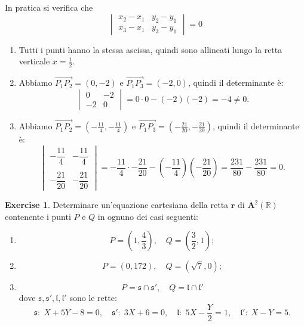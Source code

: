 \documentclass{article}
\theoremstyle{plain}
\theoremstyle{definition}
\newtheorem{xca}[exmp]{Exercise}
\theoremstyle{remark}
\begin{document}
In pratica si verifica che 
\[
\begin{vmatrix*}
x_2 - x_1 & y_2 - y_1 \\
x_3 - x_1 & y_3 - y_1
\end{vmatrix*}
=
0
\]
\begin{enumerate}
    \item Tutti i punti hanno la stessa ascissa, quindi sono allineati lungo la retta verticale $x=\frac{1}{2}$.
    \item Abbiamo $\overrightarrow{P_1P_2}=(0,-2)$ e $\overrightarrow{P_1P_3}=(-2,0)$, quindi il determinante è:
    \[ \begin{vmatrix}
        0 & -2 \\
        -2 & 0
    \end{vmatrix}= 0\cdot0 - (-2)(-2) = -4 \neq 0.\]
    \item Abbiamo $\overrightarrow{P_1P_2}=\left(-\frac{11}{4},-\frac{11}{4}\right)$ e $\overrightarrow{P_1P_3}=\left(-\frac{21}{20},-\frac{21}{20}\right)$, quindi il determinante è:
    \[ \begin{vmatrix}
        -\dfrac{11}{4} & -\dfrac{11}{4} \\\\
        -\dfrac{21}{20} & -\dfrac{21}{20}
    \end{vmatrix} = -\dfrac{11}{4}\cdot -\dfrac{21}{20} - \left(-\dfrac{11}{4}\right)\left(-\dfrac{21}{20}\right) = \dfrac{231}{80} - \dfrac{231}{80} = 0.\]
\end{enumerate}


\vspace{10pt}

\begin{bxthm}
\begin{xca}
    Determinare un'equazione cartesiana della retta $\mathbf{r}$ di $\mathbf{A}^2(\mathbb{R})$ contenente i punti $P$ e $Q$ in ognuno dei casi seguenti:
    \begin{enumerate}
        \item \[P=\left(1,\dfrac{4}{3}\right),\quad Q=\left(\dfrac{3}{2},1\right);\]
        \item \[P=\left(0,172\right),\quad Q=\left(\sqrt{7},0\right);\]
        \item \[P=\mathfrak{s}\cap\mathfrak{s}',\quad Q=\mathfrak{l}\cap\mathfrak{l}'\]
        dove $\mathfrak{s}, \mathfrak{s}', \mathfrak{l}, \mathfrak{l}'$ sono le rette:
        \[\mathfrak{s}:\;X+5Y-8=0,\quad \mathfrak{s}':\;3X+6=0,\quad \mathfrak{l}:\;5X-\dfrac{Y}{2}=1,\quad \mathfrak{l}':\;X-Y=5.\]
    \end{enumerate}
\end{xca}
\end{bxthm}
\end{document}
